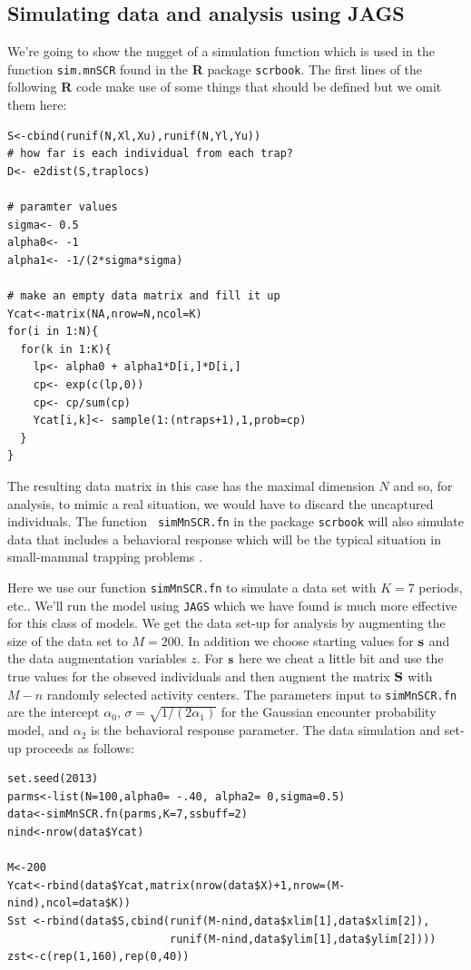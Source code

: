 \subsection{Simulating data and analysis using JAGS}

We're going to show the nugget of a simulation function which is
used in the function \mbox{\tt sim.mnSCR} found in the {\bf R} package
\mbox{\tt scrbook}.  The first lines of the following {\bf R} code
make use of some things that should be defined but we omit them here:
{\small
\begin{verbatim}
S<-cbind(runif(N,Xl,Xu),runif(N,Yl,Yu))
# how far is each individual from each trap?
D<- e2dist(S,traplocs)

# paramter values
sigma<- 0.5
alpha0<- -1
alpha1<- -1/(2*sigma*sigma)

# make an empty data matrix and fill it up
Ycat<-matrix(NA,nrow=N,ncol=K)
for(i in 1:N){
  for(k in 1:K){
    lp<- alpha0 + alpha1*D[i,]*D[i,]
    cp<- exp(c(lp,0))
    cp<- cp/sum(cp)
    Ycat[i,k]<- sample(1:(ntraps+1),1,prob=cp)
  }
}
\end{verbatim}
}
The resulting data matrix in this case has the maximal dimension $N$
and so, for analysis, to mimic a real situation, we would have to
discard the uncaptured individuals.  The function \mbox{\tt
  simMnSCR.fn} in the package \mbox{\tt scrbook}
will also
simulate data that includes a behavioral response 
 which will be the
typical situation in small-mammal trapping problems
\citep[see][for details]{converse_royle:2012}.


Here we use our function \mbox{\tt simMnSCR.fn} to simulate a data set
with $K=7$ periods, etc.. We'll run the model using \mbox{\tt JAGS} which
we have found is much more effective for this class of models.  We get
the data set-up for analysis by augmenting the size of the data set to
$M=200$. In addition we choose starting values for ${\bf s}$ and the
data augmentation variables $z$.  For ${\bf s}$ here we cheat a little
bit and use the true values for the obseved individuals and then
augment the matrix ${\bf S}$ with $M-n$ randomly selected activity
centers.  The parameters input to \mbox{\tt simMnSCR.fn} are the
intercept $\alpha_{0}$, $\sigma = \sqrt{1/(2\alpha_{1})}$ for the
Gaussian encounter probability model, and $\alpha_{2}$ is the
behavioral response parameter. The data simulation and set-up proceeds
as follows:

{\small
\begin{verbatim}
set.seed(2013)
parms<-list(N=100,alpha0= -.40, alpha2= 0,sigma=0.5)
data<-simMnSCR.fn(parms,K=7,ssbuff=2)
nind<-nrow(data$Ycat)

M<-200
Ycat<-rbind(data$Ycat,matrix(nrow(data$X)+1,nrow=(M-nind),ncol=data$K))
Sst <-rbind(data$S,cbind(runif(M-nind,data$xlim[1],data$xlim[2]),
                         runif(M-nind,data$ylim[1],data$ylim[2])))
zst<-c(rep(1,160),rep(0,40))
\end{verbatim}
}

